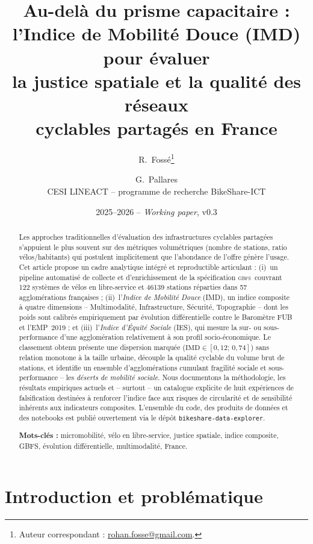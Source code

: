 \documentclass[11pt,a4paper]{article}
\title{Au-delà du prisme capacitaire :\\
       l'Indice de Mobilité Douce (IMD) pour évaluer\\
       la justice spatiale et la qualité des réseaux\\
       cyclables partagés en France}
\author{R.~Fossé\thanks{Auteur correspondant :
        \href{mailto:rohan.fosse@gmail.com}{rohan.fosse@gmail.com}.}
        \and G.~Pallares\\[2pt]
        \small CESI LINEACT -- programme de recherche BikeShare-ICT}
\date{2025--2026 -- \emph{Working paper}, v0.3}
\newcommand{\IMD}{\mathrm{IMD}}
\newcommand{\GBFS}{\textsc{gbfs}\xspace}
\begin{document}

\maketitle

\begin{abstract}
\noindent
Les approches traditionnelles d'évaluation des infrastructures
cyclables partagées s'appuient le plus souvent sur des métriques
volumétriques (nombre de stations, ratio vélos/habitants) qui
postulent implicitement que l'abondance de l'offre génère l'usage.
Cet article propose un cadre analytique intégré et reproductible
articulant : (i)~un pipeline automatisé de collecte et
d'enrichissement de la spécification \GBFS\ couvrant \num{122}
systèmes de vélos en libre-service et \num{46139} stations
réparties dans \num{57} agglomérations françaises ;
(ii)~l'\emph{Indice de Mobilité Douce} (IMD), un indice composite
à quatre dimensions -- Multimodalité, Infrastructure, Sécurité,
Topographie -- dont les poids sont calibrés empiriquement par
évolution différentielle contre le Baromètre FUB et l'EMP~2019 ;
et (iii)~l'\emph{Indice d'Équité Sociale} (IES), qui mesure la
sur- ou sous-performance d'une agglomération relativement à son
profil socio-économique. Le classement obtenu présente une
dispersion marquée ($\IMD\in[0,12;\,0,74]$) sans relation monotone
à la taille urbaine, découple la qualité cyclable du volume brut
de stations, et identifie un ensemble d'agglomérations cumulant
fragilité sociale et sous-performance -- les \emph{déserts de
mobilité sociale}. Nous documentons la méthodologie, les
résultats empiriques actuels et -- surtout -- un catalogue
explicite de huit expériences de falsification destinées à
renforcer l'indice face aux risques de circularité et de
sensibilité inhérents aux indicateurs composites. L'ensemble du
code, des produits de données et des notebooks est publié
ouvertement via le dépôt \texttt{bikeshare-data-explorer}.

\medskip
\noindent\textbf{Mots-clés :} micromobilité, vélo en libre-service,
justice spatiale, indice composite, GBFS, évolution
différentielle, multimodalité, France.
\end{abstract}

\section{Introduction et problématique}
\label{sec:introduction}
\end{document}
